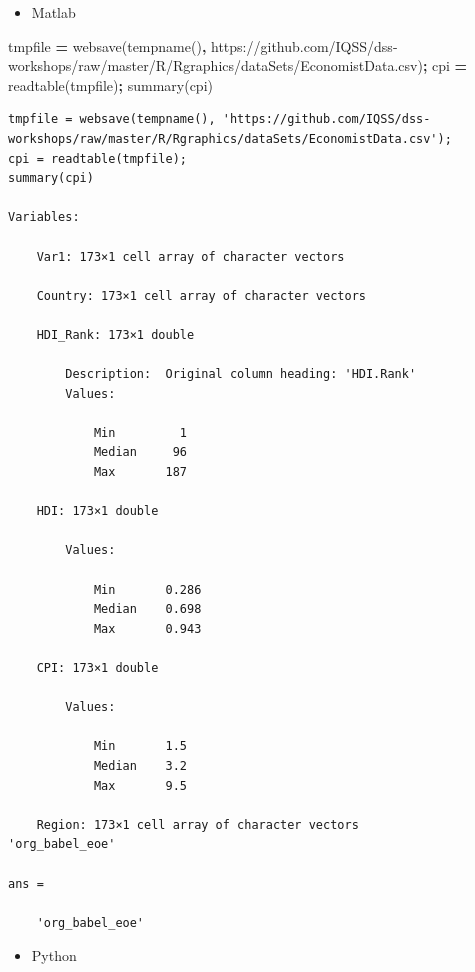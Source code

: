 \documentclass[
]{book}
\newenvironment{Shaded}{\begin{snugshade}}{\end{snugshade}}
\newcommand{\NormalTok}[1]{#1}
\newcommand{\OperatorTok}[1]{\textcolor[rgb]{0.81,0.36,0.00}{\textbf{#1}}}
\newcommand{\SpecialStringTok}[1]{\textcolor[rgb]{0.31,0.60,0.02}{#1}}
\newcommand{\VariableTok}[1]{\textcolor[rgb]{0.00,0.00,0.00}{#1}}
\providecommand{\tightlist}{%
  \setlength{\itemsep}{0pt}\setlength{\parskip}{0pt}}
\begin{document}
\begin{itemize}
\tightlist
\item
  Matlab
\end{itemize}

\begin{Shaded}
\begin{Highlighting}[]
\VariableTok{tmpfile} \OperatorTok{=} \VariableTok{websave}\NormalTok{(}\VariableTok{tempname}\NormalTok{()}\OperatorTok{,} \SpecialStringTok{\textquotesingle{}https://github.com/IQSS/dss{-}workshops/raw/master/R/Rgraphics/dataSets/EconomistData.csv\textquotesingle{}}\NormalTok{)}\OperatorTok{;}
\VariableTok{cpi} \OperatorTok{=} \VariableTok{readtable}\NormalTok{(}\VariableTok{tmpfile}\NormalTok{)}\OperatorTok{;}
\VariableTok{summary}\NormalTok{(}\VariableTok{cpi}\NormalTok{)}
\end{Highlighting}
\end{Shaded}

\begin{verbatim}
tmpfile = websave(tempname(), 'https://github.com/IQSS/dss-workshops/raw/master/R/Rgraphics/dataSets/EconomistData.csv');
cpi = readtable(tmpfile);
summary(cpi)

Variables:

    Var1: 173×1 cell array of character vectors

    Country: 173×1 cell array of character vectors

    HDI_Rank: 173×1 double

        Description:  Original column heading: 'HDI.Rank'
        Values:

            Min         1       
            Median     96       
            Max       187       

    HDI: 173×1 double

        Values:

            Min       0.286
            Median    0.698
            Max       0.943

    CPI: 173×1 double

        Values:

            Min       1.5  
            Median    3.2  
            Max       9.5  

    Region: 173×1 cell array of character vectors
'org_babel_eoe'

ans =

    'org_babel_eoe'
\end{verbatim}

\begin{itemize}
\tightlist
\item
  Python
\end{itemize}
\end{document}
